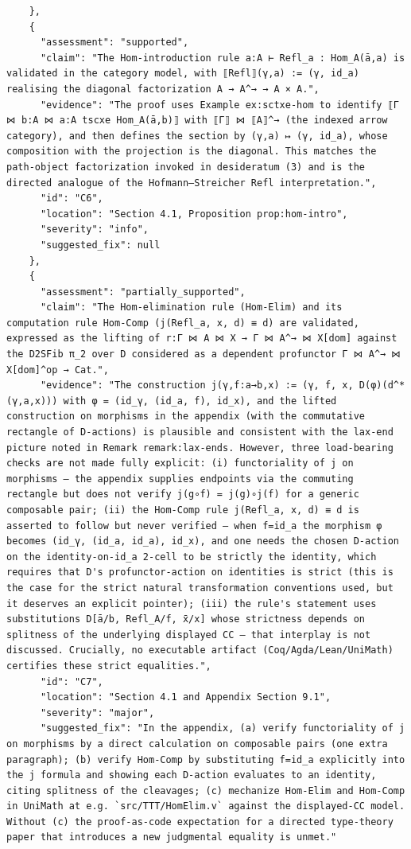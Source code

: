 \documentclass[11pt]{article}
\begin{document}
\begin{verbatim}
    },
    {
      "assessment": "supported",
      "claim": "The Hom-introduction rule a:A ⊢ Refl_a : Hom_A(ā,a) is validated in the category model, with ⟦Refl⟧(γ,a) := (γ, id_a) realising the diagonal factorization A → A^→ → A × A.",
      "evidence": "The proof uses Example ex:sctxe-hom to identify ⟦Γ ⋈ b:A ⋈ a:A tscxe Hom_A(ā,b)⟧ with ⟦Γ⟧ ⋈ ⟦A⟧^→ (the indexed arrow category), and then defines the section by (γ,a) ↦ (γ, id_a), whose composition with the projection is the diagonal. This matches the path-object factorization invoked in desideratum (3) and is the directed analogue of the Hofmann–Streicher Refl interpretation.",
      "id": "C6",
      "location": "Section 4.1, Proposition prop:hom-intro",
      "severity": "info",
      "suggested_fix": null
    },
    {
      "assessment": "partially_supported",
      "claim": "The Hom-elimination rule (Hom-Elim) and its computation rule Hom-Comp (j(Refl_a, x, d) ≡ d) are validated, expressed as the lifting of r:Γ ⋈ A ⋈ X → Γ ⋈ A^→ ⋈ X[dom] against the D2SFib π_2 over D considered as a dependent profunctor Γ ⋈ A^→ ⋈ X[dom]^op → Cat.",
      "evidence": "The construction j(γ,f:a→b,x) := (γ, f, x, D(φ)(d^*(γ,a,x))) with φ = (id_γ, (id_a, f), id_x), and the lifted construction on morphisms in the appendix (with the commutative rectangle of D-actions) is plausible and consistent with the lax-end picture noted in Remark remark:lax-ends. However, three load-bearing checks are not made fully explicit: (i) functoriality of j on morphisms — the appendix supplies endpoints via the commuting rectangle but does not verify j(g∘f) = j(g)∘j(f) for a generic composable pair; (ii) the Hom-Comp rule j(Refl_a, x, d) ≡ d is asserted to follow but never verified — when f=id_a the morphism φ becomes (id_γ, (id_a, id_a), id_x), and one needs the chosen D-action on the identity-on-id_a 2-cell to be strictly the identity, which requires that D's profunctor-action on identities is strict (this is the case for the strict natural transformation conventions used, but it deserves an explicit pointer); (iii) the rule's statement uses substitutions D[ā/b, Refl_A/f, x̄/x] whose strictness depends on splitness of the underlying displayed CC — that interplay is not discussed. Crucially, no executable artifact (Coq/Agda/Lean/UniMath) certifies these strict equalities.",
      "id": "C7",
      "location": "Section 4.1 and Appendix Section 9.1",
      "severity": "major",
      "suggested_fix": "In the appendix, (a) verify functoriality of j on morphisms by a direct calculation on composable pairs (one extra paragraph); (b) verify Hom-Comp by substituting f=id_a explicitly into the j formula and showing each D-action evaluates to an identity, citing splitness of the cleavages; (c) mechanize Hom-Elim and Hom-Comp in UniMath at e.g. `src/TTT/HomElim.v` against the displayed-CC model. Without (c) the proof-as-code expectation for a directed type-theory paper that introduces a new judgmental equality is unmet."

\end{verbatim}
\end{document}
